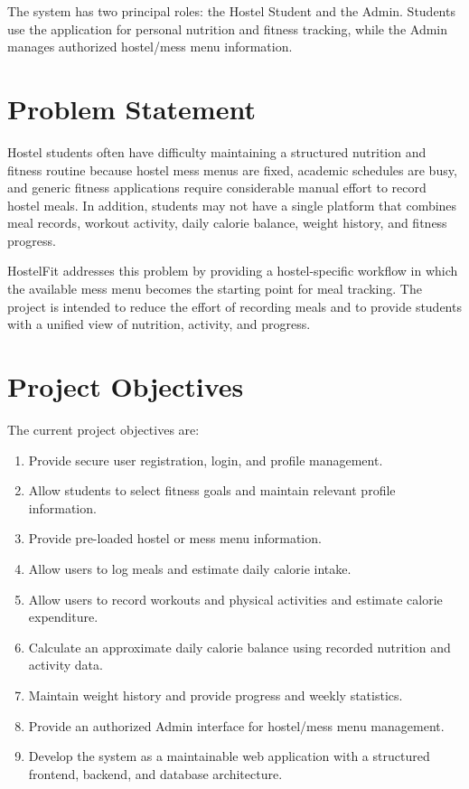 \documentclass[11pt,a4paper]{article}
\begin{document}
The system has two principal roles: the Hostel Student and the Admin. Students use the application for personal nutrition and fitness tracking, while the Admin manages authorized hostel/mess menu information.

\section{Problem Statement}
Hostel students often have difficulty maintaining a structured nutrition and fitness routine because hostel mess menus are fixed, academic schedules are busy, and generic fitness applications require considerable manual effort to record hostel meals. In addition, students may not have a single platform that combines meal records, workout activity, daily calorie balance, weight history, and fitness progress.

HostelFit addresses this problem by providing a hostel-specific workflow in which the available mess menu becomes the starting point for meal tracking. The project is intended to reduce the effort of recording meals and to provide students with a unified view of nutrition, activity, and progress.

\section{Project Objectives}
The current project objectives are:
\begin{enumerate}
    \item Provide secure user registration, login, and profile management.
    \item Allow students to select fitness goals and maintain relevant profile information.
    \item Provide pre-loaded hostel or mess menu information.
    \item Allow users to log meals and estimate daily calorie intake.
    \item Allow users to record workouts and physical activities and estimate calorie expenditure.
    \item Calculate an approximate daily calorie balance using recorded nutrition and activity data.
    \item Maintain weight history and provide progress and weekly statistics.
    \item Provide an authorized Admin interface for hostel/mess menu management.
    \item Develop the system as a maintainable web application with a structured frontend, backend, and database architecture.
\end{enumerate}
\end{document}
